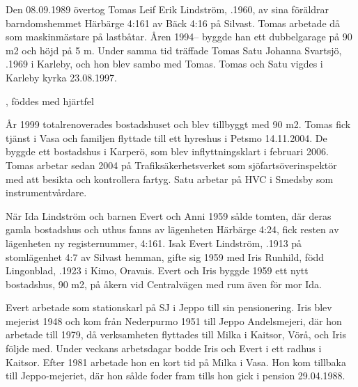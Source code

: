 %
Den 08.09.1989 övertog Tomas Leif Erik Lindström, .1960, av sina föräldrar barndomshemmet Härbärge 4:161 av Bäck 4:16 på Silvast. Tomas arbetade då som maskinmästare på lastbåtar. Åren 1994-- byggde han ett dubbelgarage på 90 m2 och höjd på 5 m. Under samma tid träffade Tomas Satu Johanna Svartsjö, .1969 i Karleby, och 	hon blev sambo med Tomas. Tomas och Satu vigdes i Karleby kyrka 23.08.1997.
\begin{jhchildren}
  \item {}, föddes med hjärtfel
  \item {}
  \item {}
  \item {}
\end{jhchildren}
År 1999 totalrenoverades bostadshuset och blev tillbyggt med 90 m2.	Tomas fick tjänst i Vasa och familjen flyttade till ett hyreshus i Petsmo 14.11.2004. De byggde ett bostadshus i Karperö, som blev inflyttningsklart i februari 2006. Tomas arbetar sedan 2004 på Trafiksäkerhetsverket som sjöfartsöverinspektör med att besikta och kontrollera fartyg. Satu arbetar på HVC i Smedsby som instrumentvårdare.


%
När Ida Lindström och barnen Evert och Anni 1959 sålde tomten, där deras gamla bostadshus och uthus fanns av lägenheten Härbärge 4:24, fick resten av lägenheten ny registernummer, 4:161. Isak Evert Lindström, .1913 på stomlägenhet 4:7 av Silvast hemman, gifte sig 1959 med Iris Runhild, född Lingonblad, .1923 i Kimo, 	Oravais. Evert och Iris byggde 1959 ett nytt bostadshus, 90 m2, på åkern vid Centralvägen med rum även för mor Ida.

Evert arbetade som 	stationskarl på SJ i Jeppo till sin pensionering. Iris blev mejerist 1948 och kom från Nederpurmo 1951 till Jeppo Andelsmejeri, där hon arbetade till 1979, då verksamheten flyttades till Milka i Kaitsor, Vörå, och Iris följde med. Under veckans arbetsdagar bodde Iris och Evert i ett radhus i Kaitsor. Efter 1981 arbetade hon en kort tid på Milka i Vasa. Hon kom tillbaka till Jeppo-mejeriet, där hon sålde foder fram tills hon gick i pension 29.04.1988.

